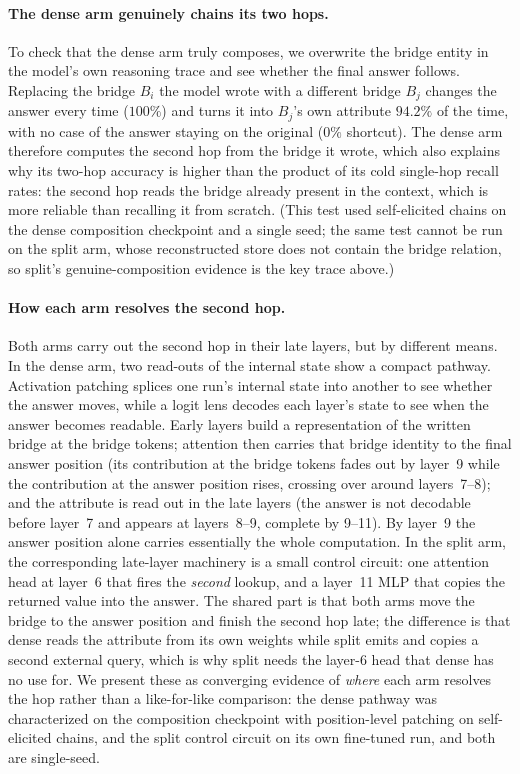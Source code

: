 \documentclass{article}
\begin{document}
\paragraph{The dense arm genuinely chains its two hops.}
To check that the dense arm truly composes, we overwrite the bridge entity in the model's own reasoning trace and see whether the final answer follows. Replacing the bridge $B_i$ the model wrote with a different bridge $B_j$ changes the answer every time ($100\%$) and turns it into $B_j$'s own attribute $94.2\%$ of the time, with no case of the answer staying on the original ($0\%$ shortcut). The dense arm therefore computes the second hop from the bridge it wrote, which also explains why its two-hop accuracy is higher than the product of its cold single-hop recall rates: the second hop reads the bridge already present in the context, which is more reliable than recalling it from scratch. (This test used self-elicited chains on the dense composition checkpoint and a single seed; the same test cannot be run on the split arm, whose reconstructed store does not contain the bridge relation, so split's genuine-composition evidence is the key trace above.)

\paragraph{How each arm resolves the second hop.}
Both arms carry out the second hop in their late layers, but by different means. In the dense arm, two read-outs of the internal state show a compact pathway. Activation patching splices one run's internal state into another to see whether the answer moves, while a logit lens decodes each layer's state to see when the answer becomes readable. Early layers build a representation of the written bridge at the bridge tokens; attention then carries that bridge identity to the final answer position (its contribution at the bridge tokens fades out by layer~9 while the contribution at the answer position rises, crossing over around layers~7--8); and the attribute is read out in the late layers (the answer is not decodable before layer~7 and appears at layers~8--9, complete by 9--11). By layer~9 the answer position alone carries essentially the whole computation. In the split arm, the corresponding late-layer machinery is a small control circuit: one attention head at layer~6 that fires the \emph{second} lookup, and a layer~11 MLP that copies the returned value into the answer. The shared part is that both arms move the bridge to the answer position and finish the second hop late; the difference is that dense reads the attribute from its own weights while split emits and copies a second external query, which is why split needs the layer-6 head that dense has no use for. We present these as converging evidence of \emph{where} each arm resolves the hop rather than a like-for-like comparison:
the dense pathway was characterized on the composition checkpoint with position-level patching on self-elicited chains, and the split control circuit on its own fine-tuned run, and both are single-seed.
\end{document}
